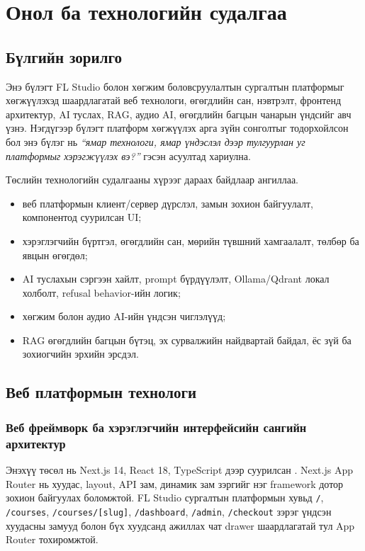 
\chapter{Онол ба технологийн судалгаа}
\label{Chapter2}

\section{Бүлгийн зорилго}
Энэ бүлэгт FL Studio болон хөгжим боловсруулалтын сургалтын платформыг хөгжүүлэхэд шаардлагатай веб технологи, өгөгдлийн сан, нэвтрэлт, фронтенд архитектур, AI туслах, RAG, аудио AI, өгөгдлийн багцын чанарын үндсийг авч үзнэ. Нэгдүгээр бүлэгт платформ хөгжүүлэх арга зүйн сонголтыг тодорхойлсон бол энэ бүлэг нь \textit{“ямар технологи, ямар үндэслэл дээр тулгуурлан уг платформыг хэрэгжүүлэх вэ?”} гэсэн асуултад хариулна.

Төслийн технологийн судалгааны хүрээг дараах байдлаар ангиллаа.
\begin{itemize}
  \item веб платформын клиент/сервер дүрслэл, замын зохион байгуулалт, компонентод суурилсан UI;
  \item хэрэглэгчийн бүртгэл, өгөгдлийн сан, мөрийн түвшний хамгаалалт, төлбөр ба явцын өгөгдөл;
  \item AI туслахын сэргээн хайлт, prompt бүрдүүлэлт, Ollama/Qdrant локал холболт, refusal behavior-ийн логик;
  \item хөгжим болон аудио AI-ийн үндсэн чиглэлүүд;
  \item RAG өгөгдлийн багцын бүтэц, эх сурвалжийн найдвартай байдал, ёс зүй ба зохиогчийн эрхийн эрсдэл.
\end{itemize}

\section{Веб платформын технологи}
\subsection{Веб фреймворк ба хэрэглэгчийн интерфейсийн сангийн архитектур}
Энэхүү төсөл нь Next.js 14, React 18, TypeScript дээр суурилсан \cite{nextjs_docs,react_learn,typescript_handbook}. Next.js App Router нь хуудас, layout, API зам, динамик зам зэргийг нэг framework дотор зохион байгуулах боломжтой. FL Studio сургалтын платформын хувьд \texttt{/}, \texttt{/courses}, \texttt{/courses/[slug]}, \texttt{/dashboard}, \texttt{/admin}, \texttt{/checkout} зэрэг үндсэн хуудасны замууд болон бүх хуудсанд ажиллах чат drawer шаардлагатай тул App Router тохиромжтой.

